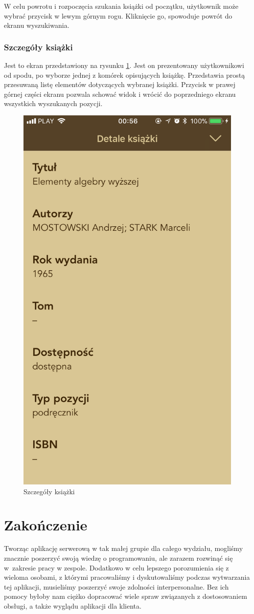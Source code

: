 \documentclass[twoside]{projektInzynierskiMS}
\begin{document}
W celu powrotu i rozpoczęcia szukania książki od początku, użytkownik może wybrać przycisk w lewym górnym rogu. Kliknięcie go, spowoduje powrót do ekranu wyszukiwania.

\subsubsection{Szczegóły książki}

Jest to ekran przedstawiony na rysunku \ref{fig:bookDetails}. Jest on prezentowany użytkownikowi od spodu, po wyborze jednej z komórek opisujących książkę. Przedstawia prostą przesuwaną listę elementów dotyczących wybranej książki. Przycisk w prawej górnej części ekranu pozwala schować widok i wrócić do poprzedniego ekranu wszystkich wyszukanych pozycji.

\begin{figure}[h]
  \centering
  \includegraphics[width=0.4\linewidth]{img/iOS/ios8.png}
  \caption{Szczegóły książki}
  \label{fig:bookDetails}
\end{figure}


\section{Zakończenie}

Tworząc aplikację serwerową w tak małej grupie dla całego wydziału, mogliśmy znacznie poszerzyć swoją wiedzę o programowaniu, ale zarazem rozwinąć się w~zakresie pracy w zespole. Dodatkowo w celu lepszego porozumienia się z wieloma osobami, z którymi pracowaliśmy i dyskutowaliśmy podczas wytwarzania tej aplikacji, musieliśmy poszerzyć swoje zdolności interpersonalne. Bez ich pomocy byłoby nam ciężko dopracować wiele spraw związanych z dostosowaniem obsługi, a także wyglądu aplikacji dla klienta.
\end{document}
